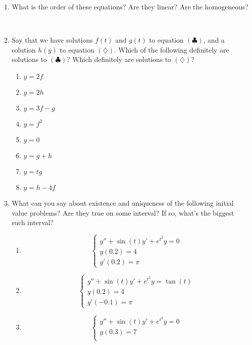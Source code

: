 \documentclass[12pt]{amsart}
\begin{document}
\begin{enumerate}
\item What is the order of these equations? Are they linear? Are the homogeneous?

\

\item Say that we have solutions $f(t)$ and $g(t)$  to equation $(\clubsuit)$, and a solution $h(y)$  to equation $(\diamondsuit)$. 
Which of the following definitely are solutions to $(\clubsuit)$? Which definitely are solutions to $(\diamondsuit)$? 
\begin{multicols}{4}
\begin{enumerate}
\item $y= 2f$
\item $y= 2h$
\item $y=3f-g$
\item $y=f^2$
\item $y=0$
\item $y=g+h$
\item $y=tg$
\item $y=h-4f$
\end{enumerate}
\end{multicols}

\item What can you say about existence and uniqueness of the following initial value problems? Are they true on some interval? If so, what's the biggest such interval?
\begin{multicols}{3}
\begin{enumerate}
\item \[ \begin{cases} y'' + \sin(t) y' + e^{t^2} y = 0 \\ 
y(0.2) = 4 \\
y'(0.2) = \pi
\end{cases}\]
\item \[ \begin{cases} y'' + \sin(t) y' + e^{t^2} y = \tan(t) \\ 
y(0.2) = 4 \\
y'(-0.1) = \pi
\end{cases}\]
\item \[ \begin{cases} y'' + \sin(t) y' + e^{t^2} y = 0 \\ 
y(0.3) = 7 \\
\end{cases}\]

\end{enumerate}
\end{multicols}
\end{enumerate}
\end{document}
